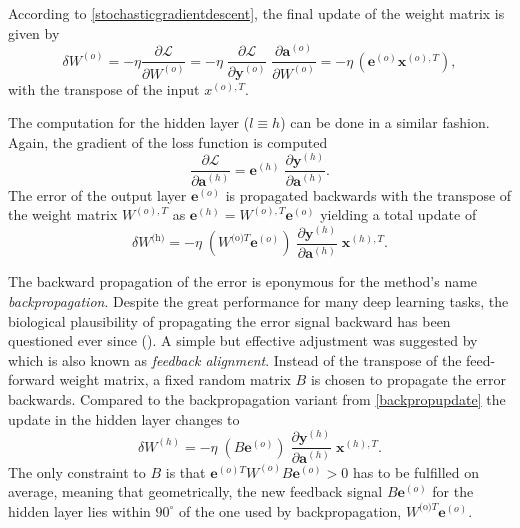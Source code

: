 According to \cref{stochasticgradientdescent}, the final update of the weight matrix is given by
\begin{equation}
\delta W^{(o)} = - \eta \frac{\partial \mathcal{L}}{\partial W^{(o)}} 
= - \eta \;
\frac{\partial\mathcal{L}}{\partial \mathbf{y}^{(o)}} \;
\frac{\partial \mathbf{a}^{(o)}}{\partial W^{(o)}}
= - \eta \, \left(\mathbf{e}^{(o)} \mathbf{x}^{(o),T}\right),
\label{backpropupdate}
\end{equation}
with the transpose of the input $x^{(o),T}$.

The computation for the hidden layer ($l\equiv h$) can be done in a similar fashion. Again, the gradient of the loss function is computed
\begin{equation*}
\frac{\partial\mathcal{L}}{\partial \mathbf{a}^{(h)}} = \mathbf{e}^{(h)} \;
\frac{\partial \mathbf{y}^{(h)} }{\partial \mathbf{a}^{(h)}}.
\end{equation*}
The error of the output layer $\mathbf{e}^{(o)}$ is propagated backwards with the transpose of the weight matrix $W^{(o),T}$ as $\mathbf{e}^{(h)}=W^{(o),T}\mathbf{e}^{(o)}$ yielding a total update of
\begin{equation*}
\delta W^{\text{(h)}} = - \eta \;
\left(W^{\text{(o)}T} \mathbf{e}^{(o)}\right) \;
\frac{\partial \mathbf{y}^{(h)} }{\partial \mathbf{a}^{(h)}} \; \mathbf{x}^{(h), T}.
\end{equation*}

The backward propagation of the error is eponymous for the method's name \textit{backpropagation}. Despite the great performance for many deep learning tasks, the biological plausibility of propagating the error signal backward has been questioned ever since (\citealp{grossberg1987competitive}). A simple but effective adjustment was suggested by \cite{lillicrap2016random} which is also known as \textit{feedback alignment}. Instead of the transpose of the feed-forward weight matrix, a fixed random matrix $B$ is chosen to propagate the error backwards. Compared to the backpropagation variant from \cref{backpropupdate} the update in the hidden layer changes to
\begin{equation*}
\delta W^{(h)} = - \eta \;
(B \mathbf{e}^{(o)}) \;
\frac{\partial \mathbf{y}^{(h)}}{\partial \mathbf{a}^{(h)}} \;
\mathbf{x}^{(h),T}.
\end{equation*}
The only constraint to $B$ is that $\mathbf{e}^{(o)T} W^{(o)} B \mathbf{e}^{(o)} > 0$ has to be fulfilled on average, meaning that geometrically, the new feedback signal $B \mathbf{e}^{(o)}$ for the hidden layer lies within $90^{\circ}$ of the one used by backpropagation, $W^{\text{(o)}T} \mathbf{e}^{(o)}$.

